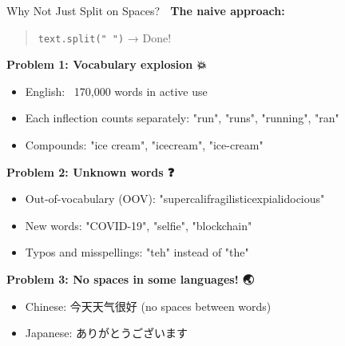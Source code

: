 \documentclass[aspectratio=169]{beamer}
\begin{document}
\begin{frame}[shrink=10]{Why Not Just Split on Spaces? 🤔}
    \textbf{The naive approach:}
    \begin{quote}
        \texttt{text.split(" ")} → Done! 🎉
    \end{quote}

    \vspace{0.5em}
    \textbf{Problem 1: Vocabulary explosion 💥}
    \begin{itemize}\setlength{\itemsep}{0pt}
        \item English: ~170,000 words in active use
        \item Each inflection counts separately: "run", "runs", "running", "ran"
        \item Compounds: "ice cream", "icecream", "ice-cream"
    \end{itemize}

    \vspace{0.5em}
    \textbf{Problem 2: Unknown words ❓}
    \begin{itemize}\setlength{\itemsep}{0pt}
        \item Out-of-vocabulary (OOV): "supercalifragilisticexpialidocious"
        \item New words: "COVID-19", "selfie", "blockchain"
        \item Typos and misspellings: "teh" instead of "the"
    \end{itemize}

    \vspace{0.5em}
    \textbf{Problem 3: No spaces in some languages! 🌏}
    \begin{itemize}\setlength{\itemsep}{0pt}
        \item Chinese: 今天天气很好 (no spaces between words)
        \item Japanese: ありがとうございます
    \end{itemize}
\end{frame}
\end{document}
